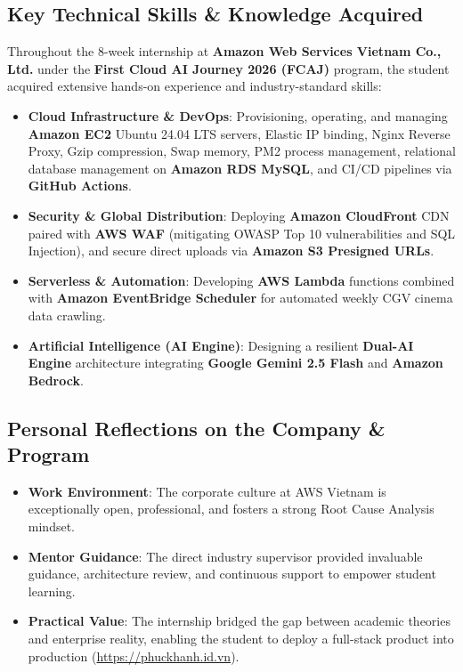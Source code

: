 \documentclass[a4paper]{article}
\begin{document}
\subsection{Key Technical Skills \& Knowledge Acquired}
Throughout the 8-week internship at \textbf{Amazon Web Services Vietnam Co., Ltd.} under the \textbf{First Cloud AI Journey 2026 (FCAJ)} program, the student acquired extensive hands-on experience and industry-standard skills:
\begin{itemize}
    \item \textbf{Cloud Infrastructure \& DevOps}: Provisioning, operating, and managing \textbf{Amazon EC2} Ubuntu 24.04 LTS servers, Elastic IP binding, Nginx Reverse Proxy, Gzip compression, Swap memory, PM2 process management, relational database management on \textbf{Amazon RDS MySQL}, and CI/CD pipelines via \textbf{GitHub Actions}.
    \item \textbf{Security \& Global Distribution}: Deploying \textbf{Amazon CloudFront} CDN paired with \textbf{AWS WAF} (mitigating OWASP Top 10 vulnerabilities and SQL Injection), and secure direct uploads via \textbf{Amazon S3 Presigned URLs}.
    \item \textbf{Serverless \& Automation}: Developing \textbf{AWS Lambda} functions combined with \textbf{Amazon EventBridge Scheduler} for automated weekly CGV cinema data crawling.
    \item \textbf{Artificial Intelligence (AI Engine)}: Designing a resilient \textbf{Dual-AI Engine} architecture integrating \textbf{Google Gemini 2.5 Flash} and \textbf{Amazon Bedrock}.
\end{itemize}

\subsection{Personal Reflections on the Company \& Program}
\begin{itemize}
    \item \textbf{Work Environment}: The corporate culture at AWS Vietnam is exceptionally open, professional, and fosters a strong Root Cause Analysis mindset.
    \item \textbf{Mentor Guidance}: The direct industry supervisor provided invaluable guidance, architecture review, and continuous support to empower student learning.
    \item \textbf{Practical Value}: The internship bridged the gap between academic theories and enterprise reality, enabling the student to deploy a full-stack product into production (\url{https://phuckhanh.id.vn}).
\end{itemize}
\end{document}
